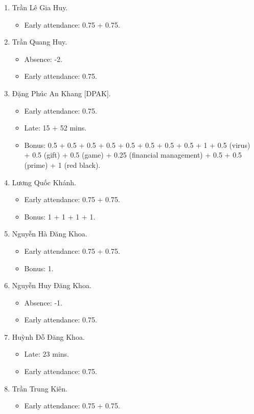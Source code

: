 \documentclass{article}
\begin{document}
\begin{enumerate}
\begin{itemize}
	\end{itemize}
	\item {\sc Trần Lê Gia Huy.}
	\begin{itemize}
		\item Early attendance: 0.75 + 0.75.
	\end{itemize}
	\item {\sc Trần Quang Huy.}
	\begin{itemize}
		\item Absence: -2.
		\item Early attendance: 0.75.
	\end{itemize}
	\item {\sc Đặng Phúc An Khang [DPAK].}
	\begin{itemize}
		\item Early attendance: 0.75.
		\item Late: 15 + 52 mins.
		\item Bonus: 0.5 + 0.5 + 0.5 + 0.5 + 0.5 + 0.5 + 0.5 + 0.5 + 1 + 0.5 (virus) + 0.5 (gift) + 0.5 (game) + 0.25 (financial management) + 0.5 + 0.5 (prime) + 1 (red black).
	\end{itemize}
	\item {\sc Lương Quốc Khánh.}
	\begin{itemize}
		\item Early attendance: 0.75 + 0.75.
		\item Bonus: 1 + 1 + 1 + 1.
	\end{itemize}
	\item {\sc Nguyễn Hà Đăng Khoa}.
	\begin{itemize}
		\item Early attendance: 0.75 + 0.75.
		\item Bonus: 1.
	\end{itemize}
	\item {\sc Nguyễn Huy Đăng Khoa.}
	\begin{itemize}
		\item Absence: -1.
		\item Early attendance: 0.75.
	\end{itemize}
	\item {\sc Huỳnh Đỗ Đăng Khoa.}
	\begin{itemize}
		\item Late: 23 mins.
		\item Early attendance: 0.75.
	\end{itemize}
	\item {\sc Trần Trung Kiên.}
	\begin{itemize}
		\item Early attendance: 0.75 + 0.75.

\end{itemize}
\end{enumerate}
\end{document}
